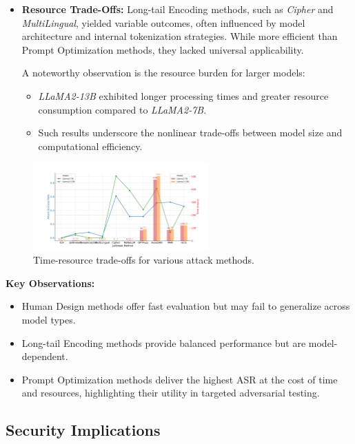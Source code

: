 \documentclass[18pt]{article}
\begin{document}
\begin{itemize}
    \item \textbf{Resource Trade-Offs:}
    Long-tail Encoding methods, such as \textit{Cipher} and \textit{MultiLingual}, yielded variable outcomes, often influenced by model architecture and internal tokenization strategies. While more efficient than Prompt Optimization methods, they lacked universal applicability.

    A noteworthy observation is the resource burden for larger models: 
    \begin{itemize}
        \item \textit{LLaMA2-13B} exhibited longer processing times and greater resource consumption compared to \textit{LLaMA2-7B}. 
        \item Such results underscore the nonlinear trade-offs between model size and computational efficiency.
    \end{itemize}
\end{itemize}

\begin{figure}[H]
    \centering
    \includegraphics[width=0.6\textwidth]{Pic_Turjo/accuracy_and_time_consumption_chart.pdf} 
    \vspace{-1em}
    \caption{Time-resource trade-offs for various attack methods.}
    \label{fig:Efficiency_Comparison}
\end{figure}

\textbf{Key Observations:}
\begin{itemize}
	\item Human Design methods offer fast evaluation but may fail to generalize across model types.
	\item Long-tail Encoding methods provide balanced performance but are model-dependent.
	\item Prompt Optimization methods deliver the highest ASR at the cost of time and resources, highlighting their utility in targeted adversarial testing.
\end{itemize}



\subsection*{Security Implications}
\end{document}
